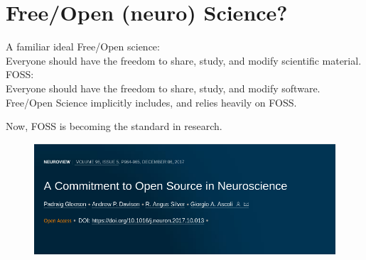 \section{Free/Open (neuro) Science?}
\begin{frame}[c]{A familiar ideal}
  Free/Open science:\\\alert{Everyone} should have the freedom to \alert{share, study, and modify} scientific material.\\
  \pause{}
  \vspace{0.5cm}
  FOSS\@:\\\alert{Everyone} should have the freedom to \alert{share, study, and modify} software\footnotemark[5].\\
  \pause{}
  \vspace{0.5cm}
  \alert{Free/Open Science implicitly includes, and relies heavily on FOSS.}\\
\end{frame}
\begin{frame}[c]{Now,}
  \alert{FOSS is becoming the standard in research\footnotemark[6].}
  \begin{figure}[htpb]
    \centering
    \includegraphics[width=\linewidth]{images/open-source-paper.png}
  \end{figure}
\end{frame}
